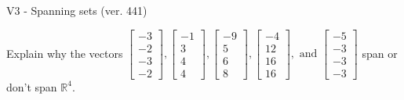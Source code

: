 \begin{exercise}
  \begin{exerciseTitle}V3 - Spanning sets (ver. 441)\end{exerciseTitle}
  \begin{exerciseStatement}
    Explain why the vectors \(\left[\begin{array}{r}
-3 \\
-2 \\
-3 \\
-2
\end{array}\right] , \left[\begin{array}{r}
-1 \\
3 \\
4 \\
4
\end{array}\right] , \left[\begin{array}{r}
-9 \\
5 \\
6 \\
8
\end{array}\right] , \left[\begin{array}{r}
-4 \\
12 \\
16 \\
16
\end{array}\right] , \text{ and } \left[\begin{array}{r}
-5 \\
-3 \\
-3 \\
-3
\end{array}\right]\) span or don't span \(\mathbb{R}^4\). 
	



\end{exerciseStatement}
\end{exercise}
